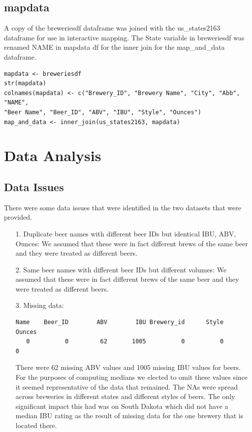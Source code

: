 \documentclass{report}
\begin{document}
\section{mapdata}
\label{sec:map}

A copy of the breweriesdf dataframe was joined with the us_states2163 dataframe for use in interactive mapping. The State variable in breweriesdf was renamed NAME in mapdata df for the inner join for the map_and_data dataframe.
\begin{verbatim}
mapdata <- breweriesdf
str(mapdata)
colnames(mapdata) <- c("Brewery_ID", "Brewery Name", "City", "Abb", "NAME", 
"Beer Name", "Beer_ID", "ABV", "IBU", "Style", "Ounces")
map_and_data <- inner_join(us_states2163, mapdata)
\end{verbatim}

\chapter{Data Analysis}
\label{cha:Analysis}

\section{Data Issues}
\label{sec:dataissues}
There were some data issues that were identified in the two datasets that were provided.
\begin{itemize}
\item[1.] Duplicate beer names with different beer IDs but identical IBU, ABV, Ounces: We assumed that these were in fact different brews of the same beer and they were treated as different beers.
\item[2.] Same beer names with different beer IDs but different volumes: We assumed that these were in fact different brews of the same beer and they were treated as different beers.
\item[3.] Missing data:
\begin{verbatim} 
Name    Beer_ID        ABV        IBU Brewery_id      Style     Ounces 
   0          0         62       1005          0          0          0 
\end{verbatim}
There were 62 missing ABV values and 1005 missing IBU values for beers. For the purposes of computing medians we elected to omit these values since it seemed representative of the data that remained. The NAs were spread across breweries in different states and different styles of beers. The only significant impact this had was on South Dakota which did not have a median IBU rating as the result of missing data for the one brewery that is located there.
\end{itemize}
\end{document}

